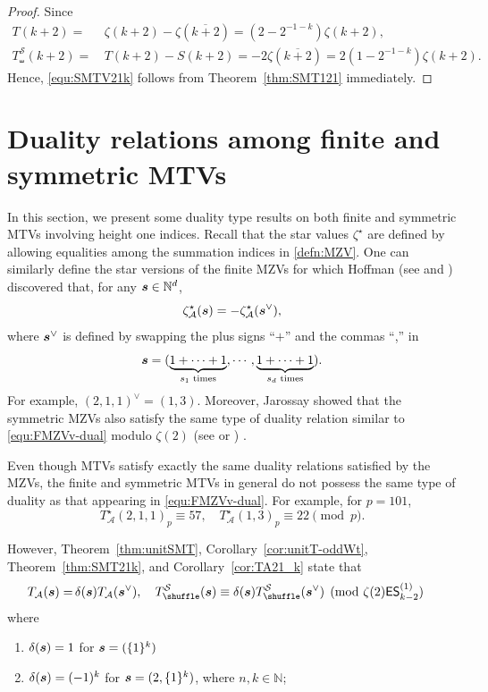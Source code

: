 \documentclass{article}
\newcommand{\ES}{\mathsf {ES}}
\newcommand{\sha}{\shuffle}
\newcommand{\Sy}{{\mathcal S}}
\newcommand{\bfs}{{\boldsymbol{\sl{s}}}}
\newcommand{\calA}{\mathcal{A}}
\newcommand{\N}{\mathbb{N}}
\newcommand{\ol}{\overline}
\theoremstyle{plain}
\theoremstyle{definition}
\begin{document}
\begin{proof} Since
\begin{align*}
  T(k+2) =&\, \zeta(k+2) - \zeta(\ol{k+2})=(2-2^{-1-k}) \zeta(k+2),\\
T_\sha^\Sy(k+2) =&\, T(k+2)-S(k+2)=-2\zeta(\ol{k+2})=2(1-2^{-1-k}) \zeta(k+2).
\end{align*}
Hence, \eqref{equ:SMTV21k} follows from Theorem~\ref{thm:SMT121} immediately.
\end{proof}



\section{Duality relations among finite and symmetric MTVs}
In this section, we  present some duality type results on both finite and symmetric MTVs involving height one indices. Recall that the star values $\zeta^\star$ are defined by allowing equalities among the summation indices in \eqref{defn:MZV}. One can similarly define the star versions of the finite MZVs for which Hoffman (see \cite{Hoffman2004} and \cite[Thm. 8.5.11]{Zhao2016}) discovered that, for any $\bfs\in\N^d$,
\begin{equation}\label{equ:FMZVv-dual}
\zeta_\calA^\star(\bfs)=-\zeta_\calA^\star(\bfs^\vee),
\end{equation}
where $\bfs^\vee$ is defined by swapping the plus signs ``$+$'' and the commas ``,'' in
\begin{equation*}
\bfs=(\underbrace{1+\cdots+1}_{\text{$s_1$ times}},\cdots,\underbrace{1+\cdots+1}_{\text{$s_d$ times}}).
\end{equation*}
For example, $(2,1,1)^\vee=(1,3)$. Moreover, Jarossay showed that the symmetric MZVs also satisfy the same type of duality relation similar to \eqref{equ:FMZVv-dual} modulo $\zeta(2)$ (see  \cite[Corollary 1.12]{Jarossay2014} or \cite[Theorem 6.3.5]{Zhao2016}) .


Even though MTVs satisfy exactly the same duality relations satisfied by the MZVs, the finite and symmetric MTVs in general do not possess the same type of duality as that appearing in \eqref{equ:FMZVv-dual}. For example, for $p=101$,
\begin{equation*}
T_\calA^\star(2,1,1)_p\equiv 57, \quad T_\calA^\star(1,3)_p\equiv 22  \pmod{p}.
\end{equation*}

However, Theorem~\ref{thm:unitSMT}, Corollary~\ref{cor:unitT-oddWt}, Theorem~\ref{thm:SMT21k}, and Corollary~\ref{cor:TA21_k} state that
\begin{align*}
T_\calA(\bfs)=&\, \delta(\bfs) T_\calA(\bfs^\vee),\quad  T_\sha^\Sy(\bfs)\equiv \delta(\bfs)T_\sha^\Sy(\bfs^\vee) \pmod{\zeta(2)\ES_{k-2}^{(1)}}
\end{align*}
where
\begin{enumerate}
    \item [\upshape{(1)}] $\delta(\bfs)=1$ for $\bfs=(\{1\}^k)$
    \item [\upshape{(2)}] $\delta(\bfs)=(-1)^k$ for $\bfs=(2,\{1\}^k)$, where $n,k\in\N$;
\end{enumerate}
\end{document}
